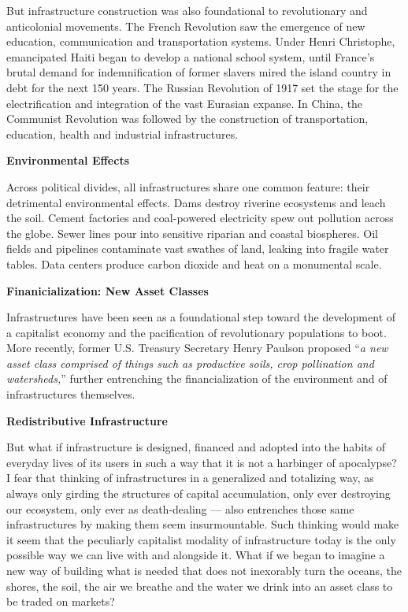 \documentclass[
]{book}
\begin{document}
But infrastructure construction was also foundational to revolutionary and anticolonial movements. The French Revolution saw the emergence of new education, communication and transportation systems. Under Henri Christophe, emancipated Haiti began to develop a national school system, until France's brutal demand for indemnification of former slavers mired the island country in debt for the next 150 years. The Russian Revolution of 1917 set the stage for the electrification and integration of the vast Eurasian expanse.
In China, the Communist Revolution was followed by the construction of transportation, education, health and industrial infrastructures.

\textbf{Environmental Effects}

Across political divides, all infrastructures share one common feature: their detrimental environmental effects. Dams destroy riverine ecosystems and leach the soil. Cement factories and coal-powered electricity spew out pollution across the globe. Sewer lines pour into sensitive riparian and coastal biospheres. Oil fields and pipelines contaminate vast swathes of land, leaking into fragile water tables. Data centers produce carbon dioxide and heat on a monumental scale.

\textbf{Finanicialization: New Asset Classes}

Infrastructures have been seen as a foundational step toward the development of a capitalist economy and the pacification of revolutionary populations to boot. More recently, former U.S. Treasury Secretary Henry Paulson proposed ``\emph{a new asset class comprised of things such as productive soils, crop pollination and watersheds,}'' further entrenching the financialization of the environment and of infrastructures themselves.

\textbf{Redistributive Infrastructure}

But what if infrastructure is designed, financed and adopted into the habits of everyday lives of its users in such a way that it is not a harbinger of apocalypse? I fear that thinking of infrastructures in a generalized and totalizing way, as always only girding the structures of capital accumulation, only ever destroying our ecosystem, only ever as death-dealing --- also entrenches those same infrastructures by making them seem insurmountable. Such thinking would make it seem that the peculiarly capitalist modality of infrastructure today is the only possible way we can live with and alongside it. What if we began to imagine a new way of building what is needed that does not inexorably turn the oceans, the shores, the soil, the air we breathe and the water we drink into an asset class to be traded on markets?
\end{document}
